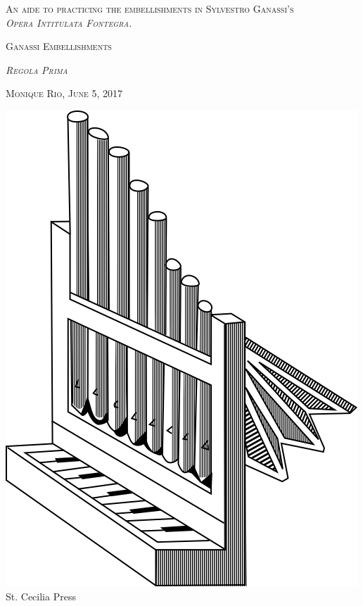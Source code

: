 \documentclass[11pt]{book}
\begin{document}
\pagestyle{fancy}

\fancyhf{}

\fancyhead[LE,RO]{\thepage}
\fancyhead[C]{   \leftmark }


\renewcommand{\headrulewidth}{0pt}
\renewcommand{\footrulewidth}{0pt}
\renewcommand{\chaptermark}[1]{\markboth{\MakeUppercase{#1}}{}}

\setlength{\parindent}{0pt}
\setlength{\parskip}{11pt plus 2pt minus 4pt}

\begin{titlepage}
    \centering
    \vspace*{2.5cm}
    {\scshape\Large An aide to practicing the embellishments in Sylvestro Ganassi's\\ 
    \em{Opera Intitulata Fontegra}. \par}
    \vspace{1cm}
    {\scshape\Huge Ganassi Embellishments} \\
    {\scshape \Huge \textit{Regola Prima} \par}
    \vspace{1cm}
    {\scshape\normalsize Monique Rio, June 5, 2017 \par}
    \vspace{2cm}
    \vfill
    \includegraphics[scale=.5]{stcpress.png}\\
    {\large St. Cecilia Press}
\end{titlepage}
\end{document}
